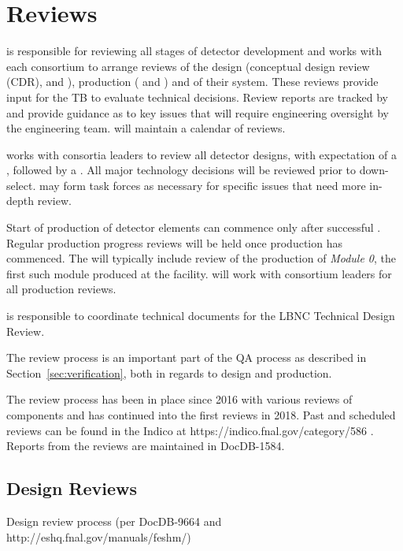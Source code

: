 \chapter{Reviews}
\label{vl:tc-review}

 is responsible for reviewing all stages of detector
development and works with each consortium to arrange reviews of the
design (conceptual design review (CDR),  and ),
production ( and ) and  of their
system.  These reviews provide input for the TB to evaluate technical
decisions.  Review reports are tracked by  and provide
guidance as to key issues that will require engineering oversight by
the  engineering team.  will maintain a calendar
of  reviews.

 works with consortia leaders to review all detector designs,
with expectation of a , followed by a .  All
major technology decisions will be reviewed prior to down-select.  
may form task forces as necessary for specific issues that need more
in-depth review.


Start of production of detector elements can commence only after
successful . Regular production progress
reviews will be held once production has commenced. The 
will typically include review of the production of \textit{Module 0}, the
first such module produced at the facility.  will work with
consortium leaders for all production reviews.

 is responsible to coordinate technical documents for the LBNC
Technical Design Review.

The review process is an important part of the  QA process
as described in Section~\ref{sec:verification}, both in regards to
design and production.

The review process has been in place since 2016 with various reviews
of  components and has continued into the first 
reviews in 2018. Past and scheduled reviews can be found in the
 Indico at https://indico.fnal.gov/category/586 .
Reports from the reviews are maintained in DocDB-1584.

\section{Design Reviews}

Design review process (per DocDB-9664 and http://eshq.fnal.gov/manuals/feshm/)


